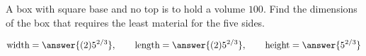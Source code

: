 \documentclass{ximera}
\author{Bart Snapp}
\begin{document}
\begin{exercise}

  
  A box with square base and no top is to hold a volume $100$.  Find
  the dimensions of the box that requires the least material for the
  five sides.
  \begin{prompt}
  \[
  \text{width}=\answer{(2) 5^{2/3}},\qquad
  \text{length}=\answer{(2) 5^{2/3}},\qquad
  \text{height}=\answer{5^{2/3}}
  \]
  \end{prompt}
\end{exercise}
\end{document}
